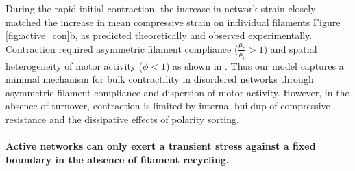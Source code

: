 \documentclass[10pt,letterpaper]{article}
\begin{document}
During the rapid initial contraction, the increase in network strain closely matched the increase in mean compressive strain on individual filaments Figure \ref{fig:active_con}b, as predicted theoretically \cite{1367-2630-14-3-033037,PhysRevX.4.041002} and observed experimentally\cite{rheo_2D1}. Contraction required asymmetric filament compliance ($\frac{\mu_e}{\mu_c} > 1$) and spatial heterogeneity of motor activity ($\phi<1$) as shown in . Thus our model captures a minimal mechanism for bulk contractility in disordered networks through asymmetric filament compliance and dispersion of motor activity. However, in the absence of turnover, contraction is limited by internal buildup of compressive resistance and the dissipative effects of polarity sorting.


\paragraph{Active networks can only exert a transient stress against a fixed boundary in the absence of filament recycling.}
\end{document}
